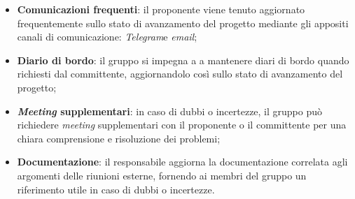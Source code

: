 \begin{itemize}
\begin{itemize}
		      \item \textbf{Comunicazioni frequenti}: il proponente viene tenuto
		            aggiornato frequentemente sullo stato di avanzamento del
		            progetto mediante gli appositi canali di comunicazione:
		            \textit{Telegram}\g e \textit{email};

		      \item \textbf{Diario di bordo}: il gruppo si impegna a a mantenere 
			  		diari di bordo quando richiesti dal committente, aggiornandolo 
					così sullo stato di avanzamento del progetto;

		      \item \textbf{\textit{Meeting} supplementari}: in caso di dubbi o 
			  		incertezze, il gruppo può richiedere \textit{meeting} supplementari 
					con il proponente o il committente per una chiara comprensione e 
					risoluzione dei problemi;

		      \item \textbf{Documentazione}: il responsabile aggiorna la documentazione 
			  		correlata agli argomenti delle riunioni esterne, fornendo ai membri 
					del gruppo un riferimento utile in caso di dubbi o incertezze.
	      \end{itemize}
\end{itemize}
